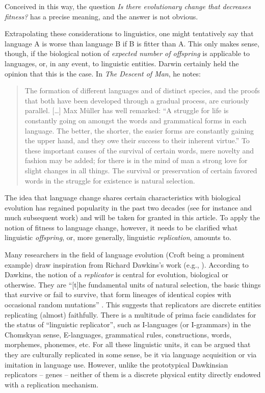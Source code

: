 \documentclass[output=paper,hidelinks]{langscibook}
\begin{document}
Conceived in this way, the question \emph{Is there evolutionary change that decreases
  fitness?} has a precise meaning, and the answer is not obvious.

Extrapolating these considerations to linguistics, one might tentatively say that language
A is worse than language B if B is fitter than A. This only makes sense, though, if the
biological notion of \emph{expected number of offspring} is applicable to languages, or,
in any event, to linguistic entities. Darwin certainly held the opinion that this is the
case. In \emph{The Descent of Man}, he notes:

  \begin{quote}\sloppy
  The formation of different languages and of distinct species, and the proofs that both
  have been developed through a gradual process, are curiously parallel. [\ldots{}] Max
  Müller has well remarked: ``A struggle for life is constantly going on amongst the
  words and grammatical forms in each language. The better, the shorter, the easier forms
  are constantly gaining the upper hand, and they owe their success to their inherent
  virtue.'' To these important causes of the survival of certain words, mere novelty and
  fashion may be added; for there is in the mind of man a strong love for slight changes
  in all things. The survival or preservation of certain favored words in the struggle
  for existence is natural selection.  \hfill\hbox{\citep[465--466]{Darwin1871}}
\end{quote}
The idea that language change shares certain characteristics with biological evolution has
regained popularity in the past two decades (see for instance \citealt{croft00} and much
subsequent work) and will be taken for granted in this article. To apply the notion of
fitness to language change, however, it needs to be clarified what linguistic
\emph{offspring}, or, more generally, linguistic \emph{replication}, amounts to.

Many researchers in the field of language evolution (Croft being a prominent example) draw
inspiration from Richard Dawkins's work (e.g., \citealt{dawkins76}). According to Dawkins,
the notion of a \emph{replicator} is central for evolution, biological or otherwise. They
are ``[t]he fundamental units of natural selection, the basic things that survive or fail
to survive, that form lineages of identical copies with occasional random mutations''
\citep[253]{dawkins76}. This suggests that replicators are discrete entities replicating
(almost) faithfully. There is a multitude of prima facie candidates for the status of
``linguistic replicator'', such as I-languages (or I-grammars) in the Chomskyan sense,
E-languages, grammatical rules, constructions, words, morphemes, phonemes, etc. For all
these linguistic units, it can be argued that they are culturally replicated in some
sense, be it via language acquisition or via imitation in language use. However, unlike
the prototypical Dawkinsian replicators -- genes -- neither of them is a discrete
physical entity directly endowed with a replication mechanism.
\end{document}
